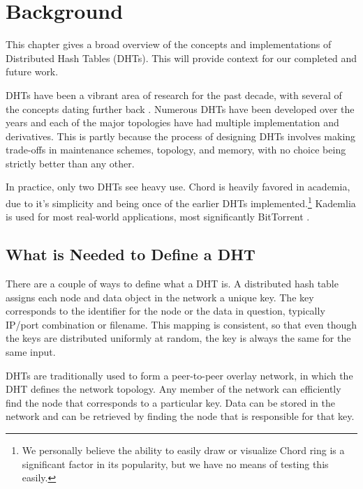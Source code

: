 \chapter{Background}
\label{chapter:background}
This chapter gives a broad overview of the concepts and implementations of Distributed Hash Tables (DHTs).
This will provide context for our completed and future work.


DHTs have been a vibrant area of research for the past decade, with several of the concepts dating further back \cite{bittorrent} \cite{kademlia}  \cite{can} \cite{ratnasamy2002ght} \cite{prr} \cite{chord} \cite{pastry}.
Numerous DHTs have been developed over the years and each of the major topologies have had multiple implementation and derivatives.
This is partly because the process of designing DHTs involves making trade-offs in maintenance schemes, topology, and memory, with no choice being strictly better than any other.

In practice, only two DHTs see heavy use.
Chord \cite{chord} is heavily favored in academia, due to it's simplicity and being once of the earlier DHTs implemented.\footnote{We personally believe the ability to easily draw or visualize Chord ring is a significant factor in its popularity, but we have no means of testing this easily.}
Kademlia \cite{kademlia} is used for most real-world applications, most significantly BitTorrent \cite{bittorrent}.






\section{What is Needed to Define a DHT}
There are a couple of ways to define what a DHT is.
A distributed hash table assigns each node and data object in the network a unique key.
The key corresponds to the identifier for the node or the data in question, typically IP/port combination or filename.
This mapping is consistent, so that even though the keys are distributed uniformly at random, the key is always the same for the same input.

DHTs are traditionally used to form a peer-to-peer overlay network, in which the DHT defines the network topology.
Any member of the network can efficiently find the node that corresponds to a particular key.
Data can be stored in the network and can be retrieved by finding the node that is responsible for that key.

